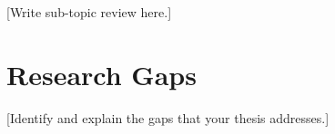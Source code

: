 [Write sub-topic review here.]

\section{Research Gaps}
\label{sec:research_gaps}


[Identify and explain the gaps that your thesis addresses.]




